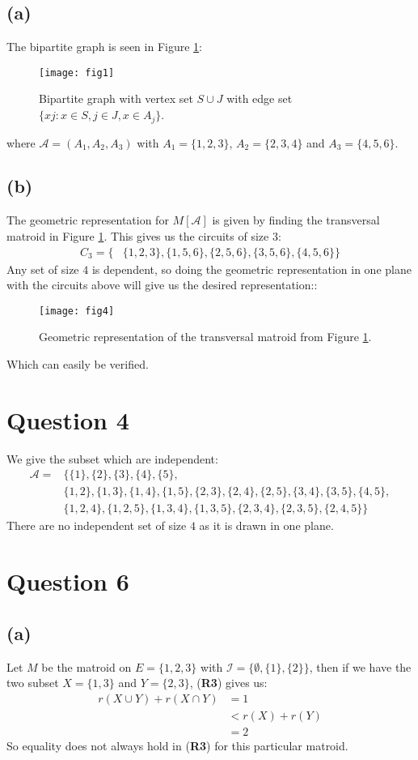 \documentclass[a4paper, fleqn]{article}
\begin{document}
\subsection*{(a)}
The bipartite graph is seen in Figure \ref{fig1}:
\begin{figure}[H]
  \centering
  \texttt{[image: fig1]}
  \caption{Bipartite graph with vertex set $S\cup J$ with edge set $\{xj :x\in S, j\in J,
  x\in A_j\}$.}
  \label{fig1}
\end{figure}
where $\mathcal{A}=(A_1,A_2,A_3)$ with $A_1=\{1,2,3\}$, $A_2=\{2,3,4\}$ and
$A_3=\{4,5,6\}$.

\subsection*{(b)}
The geometric representation for $M[\mathcal{A}]$ is given by finding the transversal
matroid in Figure \ref{fig1}. This gives us the circuits of size $3$:
\begin{align*}
  C_3 =\{&\{1,2,3\},\{1,5,6\},\{2,5,6\},\{3,5,6\},\{4,5,6\}\}
\end{align*}
Any set of size $4$ is dependent, so doing the geometric representation in one plane with
the circuits above will give us the desired representation::
\begin{figure}[H]
  \centering
  \texttt{[image: fig4]}
  \caption{Geometric representation of the transversal matroid from Figure \ref{fig1}.}
  \label{fig4}
\end{figure}
Which can easily be verified.

\section*{Question 4}
We give the subset which are independent:
\begin{align*}
  \mathcal{A}=&\{\{1\},\{2\},\{3\},\{4\},\{5\}, \\
              &\{1,2\},\{1,3\},\{1,4\},\{1,5\},\{2,3\},\{2,4\},\{2,5\},\{3,4\},\{3,5\},\{4,5\},
  \\
&\{1,2,4\},\{1,2,5\},\{1,3,4\},\{1,3,5\},\{2,3,4\},\{2,3,5\},\{2,4,5\}\}
\end{align*}
There are no independent set of size $4$ as it is drawn in one plane.

\section*{Question 6}
\subsection*{(a)}
Let $M$ be the matroid on $E=\{1,2,3\}$ with $\mathcal{I}=\{\emptyset, \{1\},\{2\}\}$,
then if we have the two subset $X=\{1,3\}$ and $Y=\{2,3\}$, (\textbf{R3}) gives us:
\begin{align*}
  r(X\cup Y)+r(X\cap Y)&=1 \\
                       &< r(X)+r(Y) \\
                       &= 2
\end{align*}
So equality does not always hold in (\textbf{R3}) for this particular matroid.
\end{document}
